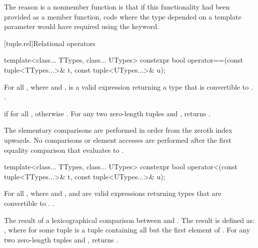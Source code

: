 \pnum
\enternote The reason  is a
nonmember function is that if this functionality had been
provided as a member function, code where the type
depended on a template parameter would have required using
the  keyword. \exitnote

[tuple.rel]{Relational operators}

%
%
\begin{itemdecl}
template<class... TTypes, class... UTypes>
  constexpr bool operator==(const tuple<TTypes...>& t, const tuple<UTypes...>& u);
\end{itemdecl}

\begin{itemdescr}
\pnum
\requires  For all ,
where  and
,  is a valid expression
returning a type that is convertible to .
 \tcode{==}
.

\pnum
\returns  {} if  for all
, otherwise .
For any two zero-length tuples  and ,  returns .

\pnum
\effects  The elementary comparisons are performed in order from the
zeroth index upwards.  No comparisons or element accesses are
performed after the first equality comparison that evaluates to
.
\end{itemdescr}

%
%
\begin{itemdecl}
template<class... TTypes, class... UTypes>
  constexpr bool operator<(const tuple<TTypes...>& t, const tuple<UTypes...>& u);
\end{itemdecl}

\begin{itemdescr}
\pnum
\requires  For all ,
where  and
, 
and 
are valid expressions returning types that are
convertible to .
 \tcode{==}
.

\pnum\returns  The result of a lexicographical comparison
between  and . The result is defined
as: , where  for some
tuple  is a tuple containing all but the first element
of .  For any two zero-length tuples 
and ,  returns .
\end{itemdescr}

